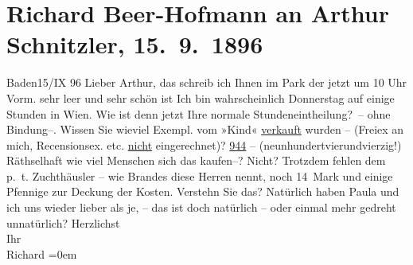 

         
         \renewcommand{\erwaehntePersonen}{Personen: Paula Beer-Hofmann, Georg Brandes}
         \renewcommand{\erwaehnteOrte}{Orte: Baden bei Wien, Wien}
         \renewcommand{\erwaehnteWerke}{Werke: Das Kind}
               \section[Richard Beer-Hofmann an Arthur Schnitzler, 15. 9. 1896]{ Richard Beer-Hofmann an Arthur Schnitzler, 15. 9. 1896}\nopagebreak{}\rehead{ }\begin{ledgroupsized}[t]{13cm}\normalsize\beginnumbering \toendnotes[C]{\smallbreak\pagebreak[2]} 
\pstart
           {\pb}Baden15/IX 96\pend
           \pstart
           Lieber Arthur, das schreib ich Ihnen im Park der jetzt um 10
                  Uhr Vorm. sehr leer und sehr schön ist\pend
           \pstart
           Ich bin wahrscheinlich Donnerstag auf einige Stunden in Wien. Wie ist denn jetzt Ihre normale Stundeneintheilung? – ohne
                  {\pb}Bindung–. Wissen Sie wieviel
               Exempl. vom »Kind« \uline{verkauft} wurden – (Freiex an mich, Recensionsex. etc. \uline{nicht} eingerechnet)?\pend
           \pstart
           \uline{944} – (neunhundertvierundvierzig!) Räthselhaft wie
               viel Menschen sich das kaufen–? Nicht? Trotzdem {\pb}fehlen dem p. t. Zuchthäusler – wie
                  Brandes diese Herren nennt, noch 14 Mark
               und einige Pfennige zur Deckung der Kosten. Verstehn Sie das?\pend
           \pstart
           Natürlich haben Paula und ich uns wieder
               lieber als {\pb}je, – das ist doch
               natürlich – oder  einmal mehr gedreht
               unnatürlich?\pend
           \pstart
           Herzlichst{\\[\baselineskip]}Ihr{\\[\baselineskip]}\spacefill\mbox{Richard}\pend
           \leftskip=0em{}
         
         \endnumbering{}\end{ledgroupsized}  \newcommand{\dateiname}{L00591}\newcommand{\titel}{Richard Beer-Hofmann an Arthur Schnitzler, 15. 9. 1896}\newcommand{\editorInnen}{Martin Anton Müller und Gerd-Hermann Susen}
      